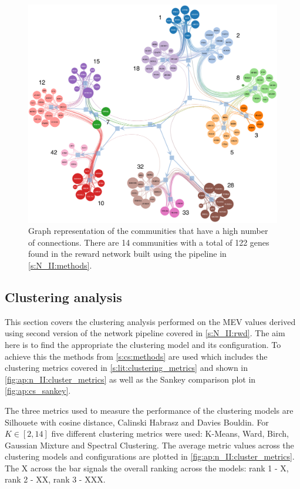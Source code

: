 \begin{figure}[H]    
    \centering
    \includegraphics[width=1.0\textwidth,height=1.0\textheight,keepaspectratio]{Sections/Network_II/resources/reward/sel_communities.png}
    \caption{Graph representation of the communities that have a high number of connections. There are 14 communities with a total of 122 genes found in the reward network built using the pipeline in \cref{s:N_II:methods}. }
    \label{fig:ap:graph_smallCom}
\end{figure}



\subsection{Clustering analysis} \label{s:ap:N_II:clustering analysis}

This section covers the clustering analysis performed on the MEV values derived using second version of the network pipeline covered in \cref{s:N_II:rwd}. The aim here is to find the appropriate the clustering model and its configuration. To achieve this the methods from \cref{s:cs:methods} are used which includes the clustering metrics covered in \cref{s:lit:clustering_metrics} and shown in \cref{fig:ap:n_II:cluster_metrics} as well as the Sankey comparison plot in \cref{fig:ap:cs_sankey}.

The three metrics used to measure the performance of the clustering models are Silhouete with cosine distance, Calinski Habrasz and Davies Bouldin. For $K\in[2,14]$ five different clustering metrics were used: K-Means, Ward, Birch, Gaussian Mixture and Spectral Clustering. The average metric values across the clustering models and configurations are plotted in \cref{fig:ap:n_II:cluster_metrics}. The X across the bar signals the overall ranking across the models: rank 1 - X, rank 2 - XX, rank 3 - XXX.


